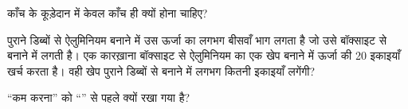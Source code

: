 \begin{exercise}[$\star$]\label{exo:g5:raw-materials-and-recycling:9}
काँच के कूड़ेदान में केवल काँच ही क्यों होना चाहिए?
\end{exercise}

\begin{exercise}[$\star\star$]\label{exo:g5:raw-materials-and-recycling:10}
पुराने डिब्बों से ऐलुमिनियम बनाने में उस ऊर्जा का लगभग बीसवाँ भाग लगता है
जो उसे बॉक्साइट से बनाने में लगती है। एक कारख़ाना बॉक्साइट से ऐलुमिनियम का
एक खेप बनाने में ऊर्जा की 20 इकाइयाँ खर्च करता है। वही खेप पुराने डिब्बों से
बनाने में लगभग कितनी इकाइयाँ लगेंगी?
\end{exercise}

\begin{exercise}[$\star\star$]\label{exo:g5:raw-materials-and-recycling:11}
``कम करना'' को ``'' से पहले क्यों रखा गया है?
\end{exercise}
